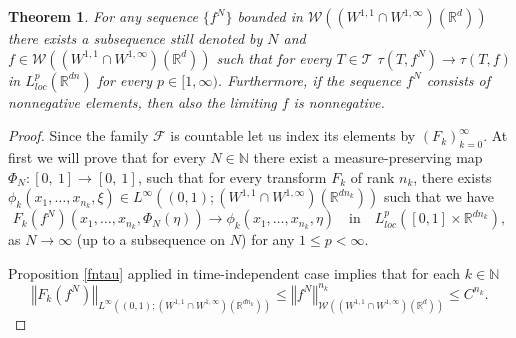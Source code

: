 \documentclass[10pt]{article}
\newtheorem{theo}{Theorem}
\newcommand{\eqq}[2]{\begin{equation}  #1  \label{#2}\end{equation}    }
\newcommand*{\norm}[1]{\left\Vert{#1}\right\Vert}
\newcommand{\R}{\mathbb{R}}
\newcommand{\Tree}{\mathcal{T}}
\newcommand{\W}{\mathcal{W}}
\begin{document}
\begin{theo}\label{lg1}
    For any sequence $\{f^N\}$ bounded in $\W((W^{1,1}\cap W^{1,\infty})(\R^d))$ there exists a subsequence still denoted by $N$ and  $f \in \W((W^{1,1}\cap W^{1,\infty})(\R^d))$ such that for every $T \in \Tree$  $\tau(T,f^N) \rightarrow \tau(T,f)$ in $L^{p}_{loc}(\R^{dn})$ for every $p \in [1,\infty)$. Furthermore, if the sequence $f^N$ consists of nonnegative elements, then also the limiting $f$ is nonnegative.
\end{theo}
\begin{proof}
Since the family $\mathcal{F}$ is countable let us index its elements by $(F_{k})_{k=0}^{\infty}$. At first we will prove that for every $N\in \mathbb{N}$ there exist a measure-preserving map $\Phi_N:[0,\ 1]\rightarrow [0,\ 1]$, such that for every transform $F_k$ of rank $n_k$, there exists $\phi_k(x_1,\dots,x_{n_{k}},\xi)\in L^{\infty}((0,1);(W^{1,1}\cap W^{1,\infty})(\R^{dn_k}))$ such that we have
\eqq{
F_k(f^N)(x_1,\dots,x_{n_k},\Phi_N(\eta))\rightarrow \phi_k(x_1,\dots,x_{n_k},\eta)\quad \mbox{in}\quad L^p_{loc}([0, 1]\times \mathbb{R}^{dn_{k}}),
}{mapcon}
as $N\rightarrow \infty$ (up to a subsequence on $N$) for  any $1\leq p<\infty$.

 Proposition \ref{fntau} applied in time-independent case implies that for each $k \in \mathbb{N}$ 
\eqq{
\norm{F_k(f^N)}_{L^{\infty}((0,1);(W^{1,1}\cap W^{1,\infty})(\R^{dn_k}))} \leq \norm{f^N}^{n_k}_{\W((W^{1,1}\cap W^{1,\infty})(\R^d))}\leq C^{n_k}.
}{unif}


\end{proof}
\end{document}
